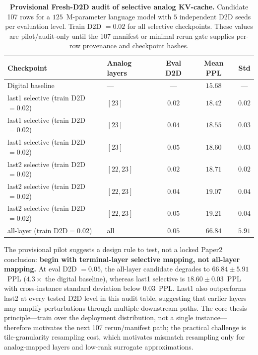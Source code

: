 \begin{table}[t]
    \centering
    \caption{\textbf{Provisional Fresh-D2D audit of selective analog KV-cache.}  Candidate 107 rows for a $125$~M-parameter language model with $5$ independent D2D seeds per evaluation level.  Train D2D $=0.02$ for all selective checkpoints.  These values are pilot/audit-only until the 107 manifest or minimal rerun gate supplies per-row provenance and checkpoint hashes.}
    \label{tab:kv-cache-107}
    \small
    \setlength{\tabcolsep}{5pt}
    \begin{tabular}{@{}llccc@{}}
        \toprule
        \textbf{Checkpoint} & \textbf{Analog layers} & \textbf{Eval D2D} & \textbf{Mean PPL} & \textbf{Std} \\
        \midrule
        Digital baseline        & ---           & ---  & $15.68$  & ---    \\
        \midrule
        last1 selective (train D2D$=0.02$) & $[23]$     & $0.02$ & $18.42$  & $0.02$ \\
        last1 selective (train D2D$=0.02$) & $[23]$     & $0.04$ & $18.55$  & $0.03$ \\
        last1 selective (train D2D$=0.02$) & $[23]$     & $0.05$ & $18.60$  & $0.03$ \\
        \midrule
        last2 selective (train D2D$=0.02$) & $[22,23]$  & $0.02$ & $18.71$  & $0.02$ \\
        last2 selective (train D2D$=0.02$) & $[22,23]$  & $0.04$ & $19.07$  & $0.04$ \\
        last2 selective (train D2D$=0.02$) & $[22,23]$  & $0.05$ & $19.21$  & $0.04$ \\
        \midrule
        all-layer (train D2D$=0.02$)       & all        & $0.05$ & $66.84$  & $5.91$ \\
        \bottomrule
    \end{tabular}
\end{table}

The provisional pilot suggests a design rule to test, not a locked Paper2 conclusion: \textbf{begin with terminal-layer selective mapping, not all-layer mapping.}  At eval D2D $=0.05$, the all-layer candidate degrades to $66.84\pm5.91$~PPL ($4.3\times$ the digital baseline), whereas last1 selective is $18.60\pm0.03$~PPL with cross-instance standard deviation below $0.03$~PPL.  Last1 also outperforms last2 at every tested D2D level in this audit table, suggesting that earlier layers may amplify perturbations through multiple downstream paths.  The core thesis principle---train over the deployment distribution, not a single instance---therefore motivates the next 107 rerun/manifest path; the practical challenge is tile-granularity resampling cost, which motivates mismatch resampling only for analog-mapped layers and low-rank surrogate approximations.


